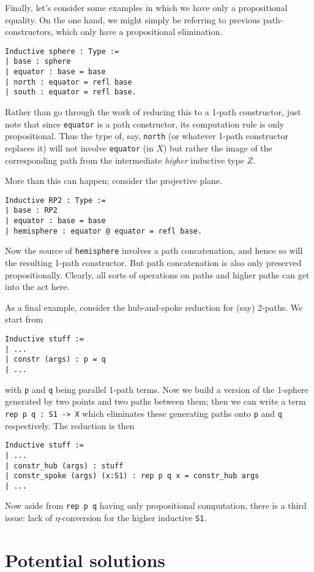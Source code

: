 \documentclass{amsart}
\begin{document}
Finally, let's consider some examples in which we have only a propositional equality.
On the one hand, we might simply be referring to previous path-constructors, which only have a propositional elimination.
\begin{verbatim}
Inductive sphere : Type :=
| base : sphere
| equator : base = base
| north : equator = refl base
| south : equator = refl base.
\end{verbatim}
Rather than go through the work of reducing this to a 1-path constructor, just note that since \texttt{equator} is a path constructor, its computation rule is only propositional.  Thus the type of, say, \texttt{north} (or whatever 1-path constructor replaces it) will not involve \texttt{equator} (in $X$) but rather the image of the corresponding path from the intermediate \emph{higher} inductive type $Z$.

More than this can happen; consider the projective plane.
\begin{verbatim}
Inductive RP2 : Type :=
| base : RP2
| equator : base = base
| hemisphere : equator @ equator = refl base.
\end{verbatim}
Now the source of \texttt{hemisphere} involves a path concatenation, and hence so will the resulting 1-path constructor.  But path concatenation is also only preserved propositionally.  Clearly, all sorts of operations on paths and higher paths can get into the act here.

As a final example, consider the hub-and-spoke reduction for (say) 2-paths.  We start from
\begin{verbatim}
Inductive stuff :=
| ...
| constr (args) : p = q
| ...
\end{verbatim}
with \texttt{p} and \texttt{q} being parallel 1-path terms.  Now we build a version of the 1-sphere generated by two points and two paths between them; then we can write a term \texttt{rep p q : S1 -> X} which eliminates these generating paths onto \texttt{p} and \texttt{q} respectively.  The reduction is then
\begin{verbatim}
Inductive stuff :=
| ...
| constr_hub (args) : stuff
| constr_spoke (args) (x:S1) : rep p q x = constr_hub args
| ...
\end{verbatim}
Now aside from \texttt{rep p q} having only propositional computation, there is a third issue: lack of $\eta$-conversion for the higher inductive \texttt{S1}.


\section{Potential solutions}
\label{sec:solutions}
\end{document}
